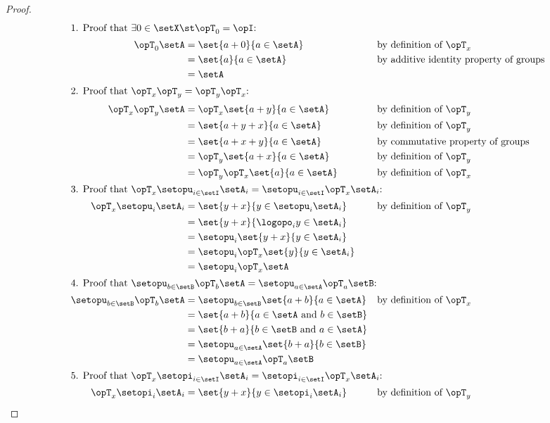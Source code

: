 \begin{proof}
\begin{align*}
  \intertext{1. Proof that $\exists 0\in\setX \st \opT_0 = \opI$:}
    \opT_0\setA
      &= \set{a+0}{a\in\setA}
      && \text{by definition of $\opT_x$}
    \\&= \set{a}{a\in\setA}
      && \text{by additive identity property of groups}
    \\&= \setA
    \\       
  \intertext{2. Proof that $\opT_x \opT_y = \opT_y \opT_x$:}
    \opT_x\opT_y\setA
      &= \opT_x\set{a+y}{a\in\setA}
      && \text{by definition of $\opT_y$}
    \\&= \set{a+y+x}{a\in\setA}
      && \text{by definition of $\opT_y$}
    \\&= \set{a+x+y}{a\in\setA}
      && \text{by commutative property of groups}
    \\&= \opT_y\set{a+x}{a\in\setA}
      && \text{by definition of $\opT_y$}
    \\&= \opT_y\opT_x\set{a}{a\in\setA}
      && \text{by definition of $\opT_x$}
    \\
  \intertext{3. Proof that $\opT_x \setopu_{i\in\setI} \setA_i = \setopu_{i\in\setI} \opT_x\setA_i$:}
    \opT_x\setopu_i \setA_i
      &= \set{y+x}{y\in\setopu_i\setA_i}
      && \text{by definition of $\opT_y$}
    \\&= \set{y+x}{\logopo_i y\in\setA_i}
    \\&= \setopu_i \set{y+x}{y\in\setA_i}
    \\&= \setopu_i \opT_x\set{y}{y\in\setA_i}
    \\&= \setopu_i \opT_x\setA
    \\
  \intertext{4. Proof that $\setopu_{b\in\setB}\opT_b \setA = \setopu_{a\in\setA} \opT_a\setB$:}
    \setopu_{b\in\setB}\opT_b \setA 
      &= \setopu_{b\in\setB} \set{a+b}{a\in\setA}
      && \text{by definition of $\opT_x$}
    \\&= \set{a+b}{a\in\setA \text{ and } b\in\setB}
    \\&= \set{b+a}{b\in\setB \text{ and } a\in\setA}
    \\&= \setopu_{a\in\setA} \set{b+a}{b\in\setB}
    \\&= \setopu_{a\in\setA} \opT_a \setB
    \\
  \intertext{5. Proof that $\opT_x \setopi_{i\in\setI} \setA_i = \setopi_{i\in\setI} \opT_x\setA_i$:}
    \opT_x\setopi_i \setA_i
      &= \set{y+x}{y\in\setopi_i\setA_i}
      && \text{by definition of $\opT_y$}

\end{align*}
\end{proof}
